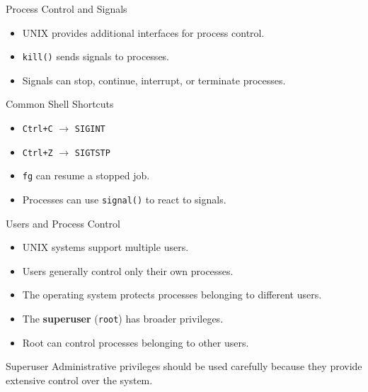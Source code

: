 \begin{frame}{Process Control and Signals}

\begin{itemize}
    \item UNIX provides additional interfaces for process control.
    \item \texttt{kill()} sends signals to processes.
    \item Signals can stop, continue, interrupt, or terminate processes.
\end{itemize}

\vspace{0.2cm}

\begin{block}{Common Shell Shortcuts}
\begin{itemize}
    \item \texttt{Ctrl+C} $\rightarrow$ \texttt{SIGINT}
    \item \texttt{Ctrl+Z} $\rightarrow$ \texttt{SIGTSTP}
    \item \texttt{fg} can resume a stopped job.
\end{itemize}
\end{block}

\begin{itemize}
    \item Processes can use \texttt{signal()} to react to signals.
\end{itemize}

\end{frame}

\begin{frame}{Users and Process Control}

\begin{itemize}
    \item UNIX systems support multiple users.
    \item Users generally control only their own processes.
    \item The operating system protects processes belonging to
          different users.
    \item The \textbf{superuser} (\texttt{root}) has broader privileges.
    \item Root can control processes belonging to other users.
\end{itemize}

\vspace{0.3cm}

\begin{alertblock}{Superuser}
Administrative privileges should be used carefully because they provide
extensive control over the system.
\end{alertblock}

\end{frame}

